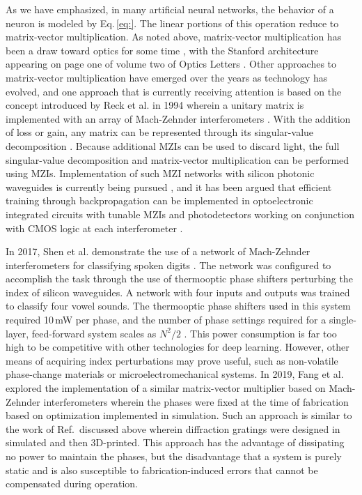 As we have emphasized, in many artificial neural networks, the behavior of a neuron is modeled by Eq.\,\ref{eq:}. The linear portions of this operation reduce to matrix-vector multiplication. As noted above, matrix-vector multiplication has been a draw toward optics for some time \cite{godi1978,ve1984,maar1987}, with the Stanford architecture appearing on page one of volume two of Optics Letters \cite{godi1978}. Other approaches to matrix-vector multiplication have emerged over the years as technology has evolved, and one approach that is currently receiving attention is based on the concept introduced by Reck et al. in 1994 wherein a unitary matrix is implemented with an array of Mach-Zehnder interferometers \cite{reze1994}. With the addition of loss or gain, any matrix can be represented through its singular-value decomposition \cite{st2016}. Because additional MZIs can be used to discard light, the full singular-value decomposition and matrix-vector multiplication can be performed using MZIs. Implementation of such MZI networks with silicon photonic waveguides is currently being pursued \cite{mi2015,shha2017}, and it has been argued that efficient training through backpropagation can be implemented in optoelectronic integrated circuits with tunable MZIs and photodetectors working on conjunction with CMOS logic at each interferometer \cite{humi2018}.

In 2017, Shen et al. demonstrate the use of a network of Mach-Zehnder interferometers for classifying spoken digits \cite{shha2017}. The network was configured to accomplish the task through the use of thermooptic phase shifters perturbing the index of silicon waveguides. A network with four inputs and outputs was trained to classify four vowel sounds. The thermooptic phase shifters used in this system required 10\,mW per phase, and the number of phase settings required for a single-layer, feed-forward system scales as $N^2/2$ \cite{reze1994}. This power consumption is far too high to be competitive with other technologies for deep learning. However, other means of acquiring index perturbations may prove useful, such as non-volatile phase-change materials or microelectromechanical systems. In 2019, Fang et al. explored the implementation of a similar matrix-vector multiplier based on Mach-Zehnder interferometers wherein the phases were fixed at the time of fabrication based on optimization implemented in simulation. Such an approach is similar to the work of Ref.\,\cite{liri2018} discussed above wherein diffraction gratings were designed in simulated and then 3D-printed. This approach has the advantage of dissipating no power to maintain the phases, but the disadvantage that a system is purely static and is also susceptible to fabrication-induced errors that cannot be compensated during operation. 

